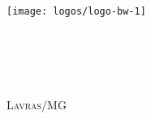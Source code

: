 
\begin{comment}
\begin{titlepage}
\maketitle
\end{titlepage} 
\end{comment}


\newpage

\begin{titlepage}
\begin{center}
\textsc{\LARGE \ImprimirEdition}\\[2.0cm]
\texttt{[image: logos/logo-bw-1]}\\[2.0cm]
\HRule{0.4cm} \\[0.4cm]
{ \fontsize{40}{60}   \bfseries \MakeUppercase{\mytitle}}\\[0.4cm]
\HRule{0.4cm} \\[0.7cm]
{\fontsize{25}{30} \textsc{\mysubtitle}}\\[0.5cm]
\vfill
{\fontsize{20}{0} \textsc{\myauthor} }\\%

\vfill
{\fontsize{20}{0} \textsc{Lavras/MG}}\\[0.4cm]
{\fontsize{20}{0} \textsc{\imprimiryear}}
\end{center}
\end{titlepage}

